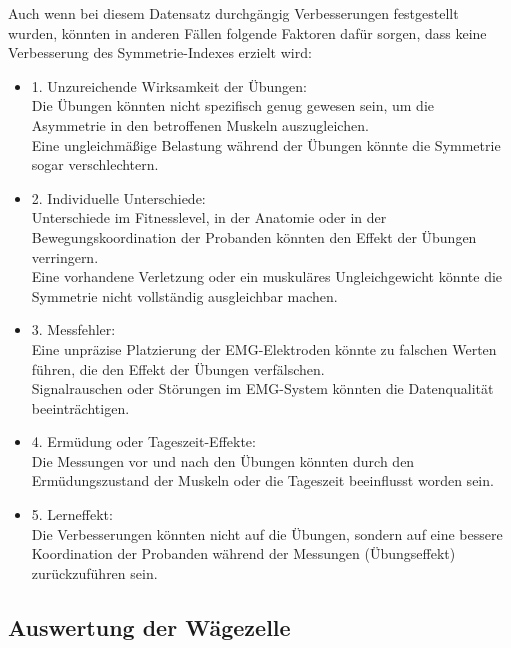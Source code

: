 Auch wenn bei diesem Datensatz durchgängig Verbesserungen festgestellt wurden, könnten in anderen Fällen folgende Faktoren dafür sorgen, dass keine Verbesserung des Symmetrie-Indexes erzielt wird:

\begin{itemize}
    \item 1. Unzureichende Wirksamkeit der Übungen:\\
    Die Übungen könnten nicht spezifisch genug gewesen sein, um die Asymmetrie in den betroffenen Muskeln auszugleichen.\\
    Eine ungleichmäßige Belastung während der Übungen könnte die Symmetrie sogar verschlechtern.\\
    \item 2. Individuelle Unterschiede: \\
    Unterschiede im Fitnesslevel, in der Anatomie oder in der Bewegungskoordination der Probanden könnten den Effekt der Übungen verringern.\\
    Eine vorhandene Verletzung oder ein muskuläres Ungleichgewicht könnte die Symmetrie nicht vollständig ausgleichbar machen.\\
    \item 3. Messfehler:\\
    Eine unpräzise Platzierung der EMG-Elektroden könnte zu falschen Werten führen, die den Effekt der Übungen verfälschen.\\
    Signalrauschen oder Störungen im EMG-System könnten die Datenqualität beeinträchtigen.\\
    \item 4. Ermüdung oder Tageszeit-Effekte:\\
    Die Messungen vor und nach den Übungen könnten durch den Ermüdungszustand der Muskeln oder die Tageszeit beeinflusst worden sein.\\
    \item 5. Lerneffekt:\\
    Die Verbesserungen könnten nicht auf die Übungen, sondern auf eine bessere Koordination der Probanden während der Messungen (Übungseffekt) zurückzuführen sein.
\end{itemize}


\subsection{Auswertung der Wägezelle}
